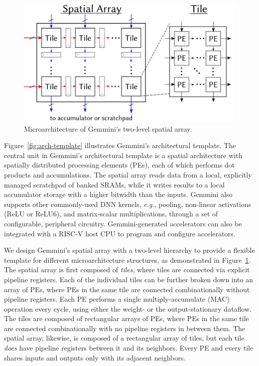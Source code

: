 \begin{figure}[t]
    \centering
    \includegraphics[width=0.85\linewidth]{fig/systolic_arch_detail3.png}
    \caption{Microarchitecture of Gemmini's two-level spatial array.} %
    \label{fig:systolic_arch}
    \vspace{-0.2in}
\end{figure}

Figure~\ref{fig:arch-template} illustrates Gemmini's architectural template.
The central unit in Gemmini's architectural template is a spatial architecture with spatially distributed processing elements (PEs), each of which performs dot products and accumulations.
The spatial array reads data from a local, explicitly managed scratchpad of banked SRAMs, while it writes results to a local accumulator storage with a higher bitwidth than the inputs.
Gemmini also supports other commonly-used DNN kernels, \textit{e.g.}, pooling, non-linear activations (ReLU or ReLU6), and matrix-scalar multiplications, through a set of configurable, peripheral circuitry.
Gemmini-generated accelerators can also be integrated with a RISC-V host CPU
to program and configure accelerators.


We design Gemmini's spatial array with a two-level hierarchy to provide a flexible template for different microarchitecture structures, as demonstrated in Figure~\ref{fig:systolic_arch}.
The spatial array is first composed of \textit{tiles}, where tiles are connected via explicit pipeline registers.
Each of the individual tiles can be further broken down into an array of PEs, where PEs in the same tile are connected combinationally without pipeline registers.
Each PE performs a single multiply-accumulate (MAC) operation every cycle, using either the weight- or the output-stationary dataflow.
The tiles are composed of rectangular arrays of PEs, where PEs in the same tile are connected combinationally with no pipeline registers in between them. The spatial array, likewise, is composed of a rectangular array of tiles, but each tile \textit{does} have pipeline registers between it and its neighbors.
Every PE and every tile shares inputs and outputs only with its adjacent neighbors.

